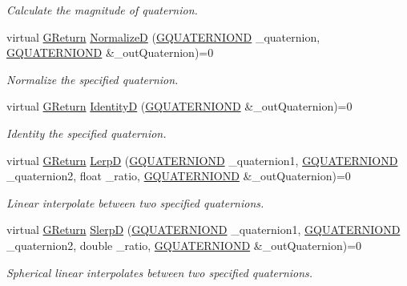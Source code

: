 \begin{DoxyCompactItemize}
\begin{DoxyCompactList}\small\item\em Calculate the magnitude of quaternion. \end{DoxyCompactList}\item 
virtual \mbox{\hyperlink{namespace_g_w_a67a839e3df7ea8a5c5686613a7a3de21}{G\+Return}} \mbox{\hyperlink{class_g_w_1_1_m_a_t_h_1_1_g_quaternion_aee972e9eadcb9656153e3a6b218e5aa9}{NormalizeD}} (\mbox{\hyperlink{struct_g_w_1_1_m_a_t_h_1_1_g_q_u_a_t_e_r_n_i_o_n_d}{G\+Q\+U\+A\+T\+E\+R\+N\+I\+O\+ND}} \+\_\+quaternion, \mbox{\hyperlink{struct_g_w_1_1_m_a_t_h_1_1_g_q_u_a_t_e_r_n_i_o_n_d}{G\+Q\+U\+A\+T\+E\+R\+N\+I\+O\+ND}} \&\+\_\+out\+Quaternion)=0
\begin{DoxyCompactList}\small\item\em Normalize the specified quaternion. \end{DoxyCompactList}\item 
virtual \mbox{\hyperlink{namespace_g_w_a67a839e3df7ea8a5c5686613a7a3de21}{G\+Return}} \mbox{\hyperlink{class_g_w_1_1_m_a_t_h_1_1_g_quaternion_a794efffc63a56778e810246cfaabb692}{IdentityD}} (\mbox{\hyperlink{struct_g_w_1_1_m_a_t_h_1_1_g_q_u_a_t_e_r_n_i_o_n_d}{G\+Q\+U\+A\+T\+E\+R\+N\+I\+O\+ND}} \&\+\_\+out\+Quaternion)=0
\begin{DoxyCompactList}\small\item\em Identity the specified quaternion. \end{DoxyCompactList}\item 
virtual \mbox{\hyperlink{namespace_g_w_a67a839e3df7ea8a5c5686613a7a3de21}{G\+Return}} \mbox{\hyperlink{class_g_w_1_1_m_a_t_h_1_1_g_quaternion_a8babbec6378f12ecd2b7ae5d6e1b64fa}{LerpD}} (\mbox{\hyperlink{struct_g_w_1_1_m_a_t_h_1_1_g_q_u_a_t_e_r_n_i_o_n_d}{G\+Q\+U\+A\+T\+E\+R\+N\+I\+O\+ND}} \+\_\+quaternion1, \mbox{\hyperlink{struct_g_w_1_1_m_a_t_h_1_1_g_q_u_a_t_e_r_n_i_o_n_d}{G\+Q\+U\+A\+T\+E\+R\+N\+I\+O\+ND}} \+\_\+quaternion2, float \+\_\+ratio, \mbox{\hyperlink{struct_g_w_1_1_m_a_t_h_1_1_g_q_u_a_t_e_r_n_i_o_n_d}{G\+Q\+U\+A\+T\+E\+R\+N\+I\+O\+ND}} \&\+\_\+out\+Quaternion)=0
\begin{DoxyCompactList}\small\item\em Linear interpolate between two specified quaternions. \end{DoxyCompactList}\item 
virtual \mbox{\hyperlink{namespace_g_w_a67a839e3df7ea8a5c5686613a7a3de21}{G\+Return}} \mbox{\hyperlink{class_g_w_1_1_m_a_t_h_1_1_g_quaternion_abbec9491d2503355f9254930cd34dd2b}{SlerpD}} (\mbox{\hyperlink{struct_g_w_1_1_m_a_t_h_1_1_g_q_u_a_t_e_r_n_i_o_n_d}{G\+Q\+U\+A\+T\+E\+R\+N\+I\+O\+ND}} \+\_\+quaternion1, \mbox{\hyperlink{struct_g_w_1_1_m_a_t_h_1_1_g_q_u_a_t_e_r_n_i_o_n_d}{G\+Q\+U\+A\+T\+E\+R\+N\+I\+O\+ND}} \+\_\+quaternion2, double \+\_\+ratio, \mbox{\hyperlink{struct_g_w_1_1_m_a_t_h_1_1_g_q_u_a_t_e_r_n_i_o_n_d}{G\+Q\+U\+A\+T\+E\+R\+N\+I\+O\+ND}} \&\+\_\+out\+Quaternion)=0
\begin{DoxyCompactList}\small\item\em Spherical linear interpolates between two specified quaternions. \end{DoxyCompactList}\end{DoxyCompactItemize}



